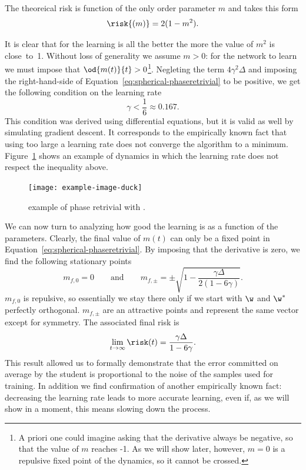 The theoreical risk is function of the only order parameter \(m\) and takes this form
\[
  \risk{(m)} = 2(1-m^2).
\]

It is clear that for the learning is all the better the more the value of \(m^2\) is close~to~1.
Without loss of generality we assume \(m>0\): for the network to learn we must impose that \(\od{m{(t)}}{t}>0\)\footnote{
  A priori one could imagine asking that the derivative always be negative, so that the value of \(m\) reaches -1.
  As we will show later, however, \(m=0\) is a repulsive fixed point of the dynamics, so it cannot be crossed.
}.
Negleting the term \(4\gamma^2\Delta\) and imposing the right-hand-side of Equation~\eqref{eq:spherical-phaseretrivial} to be positive,
we get the following condition on the learning rate
\[\gamma<\frac16 \approx \num{0.167}.\]
This condition was derived using differential equations, but it is valid as well by simulating gradient descent.
It corresponds to the empirically known fact that using too large a learning rate does not converge the algorithm to a minimum.
Figure~\ref{fig:example-spherical-not-converging} shows an example of dynamics in which the learning rate does not respect the inequality above.
\begin{figure}
  \centering
  \texttt{[image: example-image-duck]}
  \caption{
    example of phase retrivial with \(\). %
  }
  \label{fig:example-spherical-not-converging}
\end{figure}

We can now turn to analyzing how good the learning is as a function of the parameters.
Clearly, the final value of \(m{(t)}\) can only be a fixed point in Equation~\eqref{eq:spherical-phaseretrivial}.
By imposing that the derivative is zero, we find the following stationary points
\[m_{f,0} = 0 \qquad\text{and}\qquad m_{f,\pm} = \pm\sqrt{1-\frac{\gamma\Delta}{2(1-6\gamma)}}.\]
\(m_{f,0}\) is repulsive, so essentially we stay there only if we start with \(\w\) and \(\w^*\) perfectly orthogonal.
\(m_{f,\pm}\) are an attractive points and represent the same vector except for symmetry. The associated final risk is 
\[
  \lim_{t\to\infty}\risk(t) = \frac{\gamma\Delta}{1-6\gamma}.
\]
This result allowed us to formally demonstrate that the error committed on average by the student is proportional to the noise of the samples used for training.
In addition we find confirmation of another empirically known fact:
decreasing the learning rate leads to more accurate learning, even if, as we will show in a moment,
this means slowing down the process.

